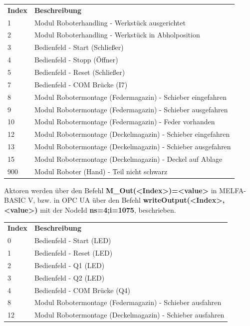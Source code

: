 \documentclass{article}
\begin{document}
\begin{center}
	\setlength\extrarowheight{4pt}
	\small
	\begin{tabularx}{\textwidth}{|p{4cm}|X|}
		\hline
		\rowcolor{tublau}
		\multicolumn{2}{|c|}{\bf \color{white} \large Sensoren}\\
		\hline\hline
		\rowcolor{gray!80}
		\bf Index & \bf Beschreibung\\
		\hline\hline
		1 & Modul Roboterhandling - Werkstück ausgerichtet\\
		2 & Modul Roboterhandling - Werkstück in Abholposition\\
		3 & Bedienfeld - Start (Schließer)\\
		4 & Bedienfeld - Stopp (Öffner) \\
		5 & Bedienfeld - Reset (Schließer)\\
		7 & Bedienfeld - COM Brücke (I7)\\
		8 & Modul Robotermontage (Federmagazin) - Schieber eingefahren\\
		9 & Modul Robotermontage (Federmagazin) - Schieber ausgefahren\\
		10 & Modul Robotermontage (Federmagazin) - Feder vorhanden \\
		12 & Modul Robotermontage (Deckelmagazin) - Schieber eingefahren\\
		13 & Modul Robotermontage (Deckelmagazin) - Schieber ausgefahren\\
		15 & Modul Robotermontage (Deckelmagazin) - Deckel auf Ablage\\
		900 & Modul Roboter (Hand) - Teil nicht schwarz\\
		\hline
	\end{tabularx}
\end{center}
Aktoren werden über den Befehl \textbf{M\_Out(<Index>)=<value>} in MELFA-BASIC V, bzw. in OPC UA über den Befehl \textbf{writeOutput(<Index>,<value>)} mit der NodeId \textbf{ns=4;i=1075}, beschrieben.
\begin{center}
	\setlength\extrarowheight{4pt}
	\small
	\begin{tabularx}{\textwidth}{|p{4cm}|X|}
		\hline
		\rowcolor{tublau}
		\multicolumn{2}{|c|}{\bf \color{white} \large Aktoren}\\
		\hline\hline
		\rowcolor{gray!80}
		\bf Index & \bf Beschreibung\\
		\hline\hline
		0 & Bedienfeld - Start (LED)\\
		1 & Bedienfeld - Reset (LED)\\
		2 & Bedienfeld - Q1 (LED)\\
		3 & Bedienfeld - Q2 (LED)\\
		4 & Bedienfeld - COM Brücke (Q4)\\
		8 & Modul Robotermontage (Federmagazin) - Schieber ausfahren\\
		12 & Modul Robotermontage (Deckelmagazin) - Schieber ausfahren\\
		\hline
	\end{tabularx}
\end{center}
\end{document}

